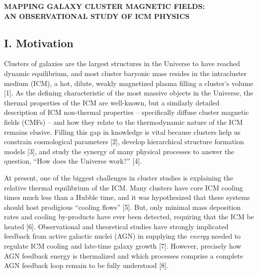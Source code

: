 \documentclass[letterpaper,11pt]{article}
\begin{document}
\begin{center}
  {\bf\uppercase{mapping galaxy cluster magnetic fields:\\an
      observational study of icm physics}}
\end{center}

\subsection*{I. Motivation}

Clusters of galaxies are the largest structures in the Universe to
have reached dynamic equilibrium, and most cluster baryonic mass
resides in the intracluster medium (ICM), a hot, dilute, weakly
magnetized plasma filling a cluster's volume [1]. As the defining
characteristic of the most massive objects in the Universe, the
thermal properties of the ICM are well-known, but a similarly detailed
description of ICM non-thermal properties -- specifically diffuse
cluster magnetic fields (CMFs) -- and how they relate to the
thermodynamic nature of the ICM remains elusive. Filling this gap in
knowledge is vital because clusters help us constrain cosmological
parameters [2], develop hierarchical structure formation models [3],
and study the synergy of many physical processes to answer the
question, ``How does the Universe work?'' [4].

At present, one of the biggest challenges in cluster studies is
explaining the relative thermal equilibrium of the ICM. Many clusters
have core ICM cooling times much less than a Hubble time, and it was
hypothesized that these systems should host prodigious ``cooling
flows'' [5]. But, only minimal mass deposition rates and cooling
by-products have ever been detected, requiring that the ICM be heated
[6]. Observational and theoretical studies have strongly implicated
feedback from active galactic nuclei (AGN) in supplying the
{\it{energy}} needed to regulate ICM cooling and late-time galaxy
growth [7]. However, precisely how AGN feedback energy is thermalized
and which processes comprise a complete AGN feedback loop remain to be
fully understood [8].
\end{document}

